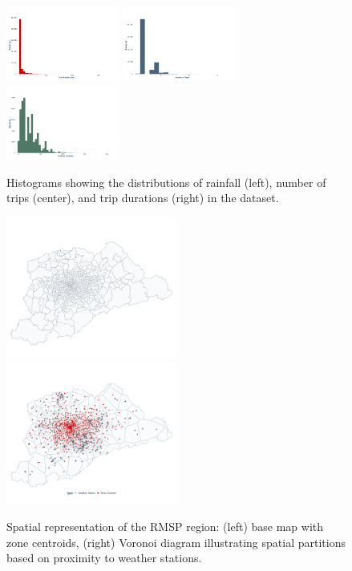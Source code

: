 \begin{figure}[H]
    \centering
    \includegraphics[width=0.33\textwidth]{../figures/rainfall_histogram.png}
    \includegraphics[width=0.33\textwidth]{../figures/trips_histogram.png}
    \includegraphics[width=0.33\textwidth]{../figures/duration_histogram.png}
    \caption{Histograms showing the distributions of rainfall (left), number of trips (center), and trip durations (right) in the dataset.}
    \label{fig:hist}
\end{figure}

\begin{figure}[H]
    \centering
    \includegraphics[width=0.5\textwidth]{../figures/rmsp_base.png}
    \includegraphics[width=0.5\textwidth]{../figures/rmsp_voronoi.png}
    \caption{Spatial representation of the RMSP region: (left) base map with zone centroids, (right) Voronoi diagram illustrating spatial partitions based on proximity to weather stations.}
    \label{fig:rmsp_voronoi}
\end{figure}
